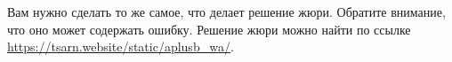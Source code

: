 Вам нужно сделать то же самое, что делает решение жюри. Обратите внимание, что оно может содержать ошибку. Решение жюри можно найти по ссылке \url{https://tsarn.website/static/aplusb\_wa/}.